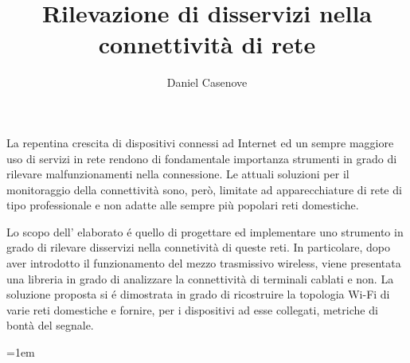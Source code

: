 \documentclass[12pt,a4paper,twoside,openright]{book}
\author{Daniel Casenove}
\title{Rilevazione di disservizi nella connettività di rete}
\makeatletter
\newenvironment{abstract}%
	{\cleardoublepage%
		\thispagestyle{empty}%
		 \null \vfill\begin{center}%
			\bfseries \abstractname \end{center}}%
	{\vfill\null}
\newcommand{\fncyfront}{%
	\fancyhead[RO]{{\footnotesize\rightmark}} 
	\fancyfoot[RO]{\thepage} \fancyhead[LE]{\footnotesize{\leftmark}} 
	\fancyfoot[LE]{\thepage} 
	\fancyhead[RE,LO]{}
	\fancyfoot[C]{}
	\setlength{\headheight}{14.5pt}
\renewcommand{\headrulewidth}{0.3pt}}
\newcommand{\fncymain}{%
	\fancyhead[RO]{{\bfseries\footnotesize\rightmark}} 
	\fancyfoot[RO]{\bfseries\thepage} 
	\fancyhead[LE]{{\bfseries\footnotesize\leftmark}} 
	\fancyfoot[LE]{\bfseries\thepage}
	\fancyfoot[C]{} 
	\setlength{\headheight}{26pt}
\renewcommand{\headrulewidth}{2pt}}
\def\cleardoublepage{\clearpage\if@twoside \ifodd\c@page \else\hbox{}\thispagestyle{empty}\newpage
\if@twocolumn\hbox{}\newpage\fi\fi\fi} \makeatother
\makeatother
\begin{document}
\pagestyle{fancy}
\fncyfront
\frontmatter
\begin{frontespizio}
\Margini{2.5cm}{1.5cm}{2.5cm}{1cm}
  
\end{frontespizio}

\begin{abstract}
 
La repentina crescita di dispositivi connessi ad Internet ed un sempre maggiore uso di servizi in rete rendono di fondamentale importanza strumenti in grado di rilevare malfunzionamenti nella connessione.
Le attuali soluzioni per il monitoraggio della connettivit\`a sono, per\`o, limitate ad apparecchiature di rete di tipo professionale e non adatte alle sempre pi\`u popolari reti domestiche.

Lo scopo dell' elaborato \'e quello di progettare ed implementare uno strumento in grado di rilevare disservizi nella connetivit\`a di queste reti.
In particolare, dopo aver introdotto il funzionamento del mezzo trasmissivo wireless, viene presentata una libreria in grado di analizzare la connettivit\`a di terminali cablati e non.
La soluzione proposta si \'e dimostrata in grado di ricostruire la topologia Wi-Fi di varie reti domestiche e fornire, per i dispositivi ad esse collegati, metriche di bont\`a del segnale.


\end{abstract}

\tableofcontents
\fncymain
\mainmatter
{}








\backmatter
\emergencystretch=1em
\printbibliography[heading=bibintoc]

\begin{appendices}

\end{appendices}
\end{document}
